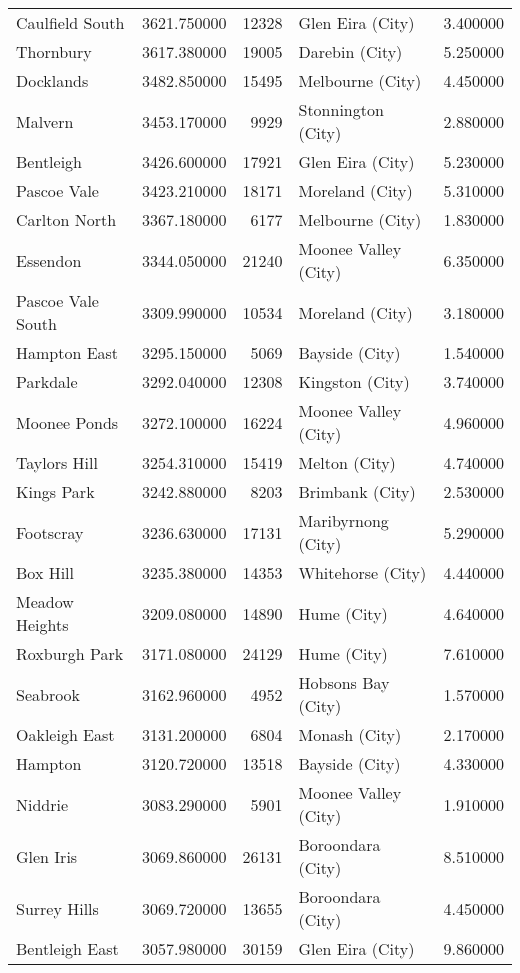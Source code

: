 \begin{table}
\begin{tabular}{lrrlr}
Caulfield South & 3621.750000 & 12328 & Glen Eira (City) & 3.400000 \\
Thornbury & 3617.380000 & 19005 & Darebin (City) & 5.250000 \\
Docklands & 3482.850000 & 15495 & Melbourne (City) & 4.450000 \\
Malvern & 3453.170000 & 9929 & Stonnington (City) & 2.880000 \\
Bentleigh & 3426.600000 & 17921 & Glen Eira (City) & 5.230000 \\
Pascoe Vale & 3423.210000 & 18171 & Moreland (City) & 5.310000 \\
Carlton North & 3367.180000 & 6177 & Melbourne (City) & 1.830000 \\
Essendon & 3344.050000 & 21240 & Moonee Valley (City) & 6.350000 \\
Pascoe Vale South & 3309.990000 & 10534 & Moreland (City) & 3.180000 \\
Hampton East & 3295.150000 & 5069 & Bayside (City) & 1.540000 \\
Parkdale & 3292.040000 & 12308 & Kingston (City) & 3.740000 \\
Moonee Ponds & 3272.100000 & 16224 & Moonee Valley (City) & 4.960000 \\
Taylors Hill & 3254.310000 & 15419 & Melton (City) & 4.740000 \\
Kings Park & 3242.880000 & 8203 & Brimbank (City) & 2.530000 \\
Footscray & 3236.630000 & 17131 & Maribyrnong (City) & 5.290000 \\
Box Hill & 3235.380000 & 14353 & Whitehorse (City) & 4.440000 \\
Meadow Heights & 3209.080000 & 14890 & Hume (City) & 4.640000 \\
Roxburgh Park & 3171.080000 & 24129 & Hume (City) & 7.610000 \\
Seabrook & 3162.960000 & 4952 & Hobsons Bay (City) & 1.570000 \\
Oakleigh East & 3131.200000 & 6804 & Monash (City) & 2.170000 \\
Hampton & 3120.720000 & 13518 & Bayside (City) & 4.330000 \\
Niddrie & 3083.290000 & 5901 & Moonee Valley (City) & 1.910000 \\
Glen Iris & 3069.860000 & 26131 & Boroondara (City) & 8.510000 \\
Surrey Hills & 3069.720000 & 13655 & Boroondara (City) & 4.450000 \\
Bentleigh East & 3057.980000 & 30159 & Glen Eira (City) & 9.860000 \\

\end{tabular}
\end{table}
